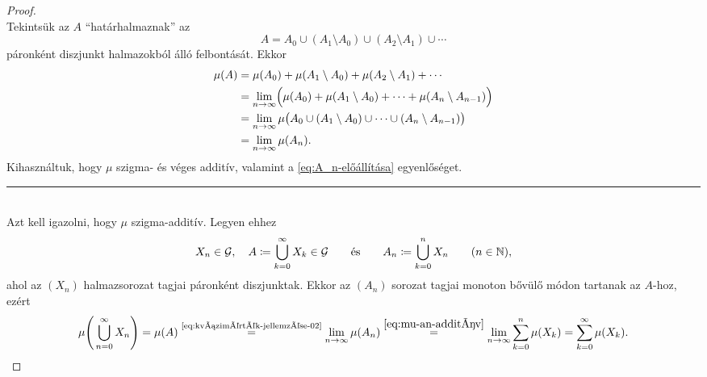 \documentclass[
]{elteikthesis}[2024/04/26]
\begin{document}
	\begin{proof} \,\\[6pt]
		
		\fbox{\ref{eq:kvázimérték-jellemzése-01} \( \Longrightarrow \)
			  \ref{eq:kvázimérték-jellemzése-02}}
		Tekintsük az \( A \) ``határhalmaznak'' az
		\[
			A = A_0 \cup (A_1 \setminus A_0) \cup (A_2 \setminus A_1) \cup \cdots
		\]
		páronként diszjunkt halmazokból álló felbontását. Ekkor
		\begin{align*}
			\mu(A)
			&= \mu(A_0) + \mu(A_1 \setminus A_0) + \mu(A_2 \setminus A_1) + \cdots \\
			&= \lim_{n \to \infty} \Bigl( 
			\mu(A_0) + \mu(A_1 \setminus A_0) + \cdots + \mu(A_n \setminus A_{n-1})
			\Bigr)\\
			&= \lim_{n \to \infty} \mu \bigl( 
			A_0 \cup (A_1 \setminus A_0) \cup \cdots \cup (A_n \setminus A_{n-1})
			\bigr) \\
			&= \lim_{n \to \infty} \mu (A_n).
		\end{align*}
		Kihasználtuk, hogy \( \mu \) szigma- és véges additív, 
		valamint a \eqref{eq:A_n-előállítása} egyenlőséget.
		
		\noindent\rule{\linewidth}{0.4pt}\\
		
		\fbox{\ref{eq:kvázimérték-jellemzése-02} \( \Longrightarrow \)
			  \ref{eq:kvázimérték-jellemzése-01}}
		Azt kell igazolni, hogy \( \mu \) szigma-additív. Legyen ehhez
		\[
			X_n \in \mathcal{G}, \quad
			A \coloneq \bigcup_{k=0}^{\infty} X_k \in \mathcal{G} \qquad \text{és} \qquad
			A_n \coloneq \bigcup_{k=0}^{n} X_n \qquad (n \in \mathbb{N}),
		\]
		ahol az \( (X_n) \) halmazsorozat tagjai páronként diszjunktak. 
		Ekkor az \( (A_n) \) sorozat tagjai monoton bővülő módon tartanak az \( A \)-hoz,
		ezért
		\[
			\mu \Biggl( \, \bigcup_{n=0}^{\infty} X_n \Biggr) =
			\mu (A) \overset{\text{\ref{eq:kvázimérték-jellemzése-02}}}{=}
			\lim_{n \to \infty} \mu( A_n ) \overset{\eqref{eq:mu-an-additív}}{=}
			\lim_{n \to \infty} \sum_{k=0}^{n} \mu( X_k ) =
			\sum_{k=0}^{\infty} \mu( X_k ).
		\]
		

\end{proof}
\end{document}
